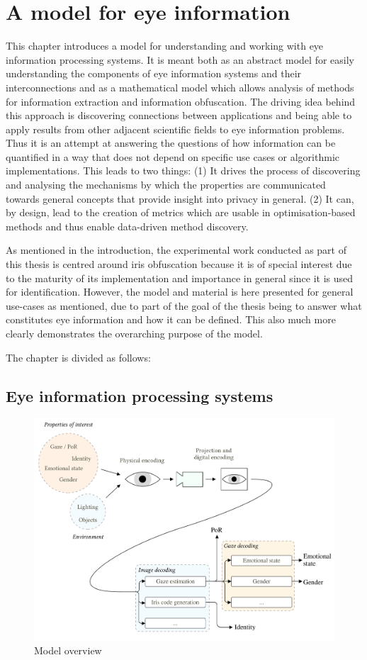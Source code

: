 \chapter{A model for eye information}
This chapter introduces a model for understanding and working with eye information processing systems. It is meant both as an abstract model for easily understanding the components of eye information systems and their interconnections and as a mathematical model which allows analysis of methods for information extraction and information obfuscation. The driving idea behind this approach is discovering connections between applications and being able to apply results from other adjacent scientific fields to eye information problems. Thus it is an attempt at answering the questions of how information can be quantified in a way that does not depend on specific use cases or algorithmic implementations. This leads to two things: (1) It drives the process of discovering and analysing the mechanisms by which the properties are communicated towards general concepts that provide insight into privacy in general. (2) It can, by design, lead to the creation of metrics which are usable in optimisation-based methods and thus enable data-driven method discovery.

As mentioned in the introduction, the experimental work conducted as part of this thesis is centred around iris obfuscation because it is of special interest due to the maturity of its implementation and importance in general since it is used for identification. However, the model and material is here presented for general use-cases as mentioned, due to part of the goal of the thesis being to answer what constitutes eye information and how it can be defined. This also much more clearly demonstrates the overarching purpose of the model.

The chapter is divided as follows: 

\section{Eye information processing systems}
\begin{figure}
	\centering
	\includegraphics[width=1\textwidth]{figures/model/eye-tracking-model}
	\caption{Model overview}\label{fig:eye-tracking-model}
\end{figure}

